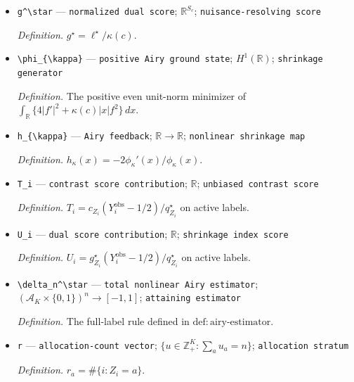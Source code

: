\documentclass{article}
\begin{document}
\begin{itemize}
  \par\smallskip\noindent\emph{Definition.} The lexicographically least dual optimizer in \(\mathrm{def:dual\text{-}score}\).
  \item \texttt{g\textasciicircum{}\textbackslash{}\allowbreak{}star} --- \texttt{normalized dual score}; \(\mathbb R^{S_c}\); \texttt{nuisance-\allowbreak{}resolving score}
  \par\smallskip\noindent\emph{Definition.} \(g^\star=\ell^\star/\kappa(c)\).
  \item \texttt{\textbackslash{}\allowbreak{}phi\_\allowbreak{}\{\textbackslash{}\allowbreak{}kappa\}\allowbreak{}} --- \texttt{positive Airy ground state}; \(H^1(\mathbb R)\); \texttt{shrinkage generator}
  \par\smallskip\noindent\emph{Definition.} The positive even unit-norm minimizer of \(\int_{\mathbb R}\{4|f'|^2+\kappa(c)|x|f^2\}\,dx\).
  \item \texttt{h\_\allowbreak{}\{\textbackslash{}\allowbreak{}kappa\}\allowbreak{}} --- \texttt{Airy feedback}; \(\mathbb R\to\mathbb R\); \texttt{nonlinear shrinkage map}
  \par\smallskip\noindent\emph{Definition.} \(h_{\kappa}(x)=-2\phi_{\kappa}'(x)/\phi_{\kappa}(x)\).
  \item \texttt{T\_\allowbreak{}i} --- \texttt{contrast score contribution}; \(\mathbb R\); \texttt{unbiased contrast score}
  \par\smallskip\noindent\emph{Definition.} \(T_i=c_{Z_i}(Y_i^{\mathrm{obs}}-1/2)/q_{Z_i}^\star\) on active labels.
  \item \texttt{U\_\allowbreak{}i} --- \texttt{dual score contribution}; \(\mathbb R\); \texttt{shrinkage index score}
  \par\smallskip\noindent\emph{Definition.} \(U_i=g_{Z_i}^\star(Y_i^{\mathrm{obs}}-1/2)/q_{Z_i}^\star\) on active labels.
  \item \texttt{\textbackslash{}\allowbreak{}delta\_\allowbreak{}n\textasciicircum{}\textbackslash{}\allowbreak{}star} --- \texttt{total nonlinear Airy estimator}; \((\mathcal A_K\times\{0,1\})^n\to[-1,1]\); \texttt{attaining estimator}
  \par\smallskip\noindent\emph{Definition.} The full-label rule defined in \(\mathrm{def:airy\text{-}estimator}\).
  \item \texttt{r} --- \texttt{allocation-\allowbreak{}count vector}; \(\{u\in\mathbb Z_+^K:\sum_au_a=n\}\); \texttt{allocation stratum}
  \par\smallskip\noindent\emph{Definition.} \(r_a=\#\{i:Z_i=a\}\).

\end{itemize}
\end{document}
